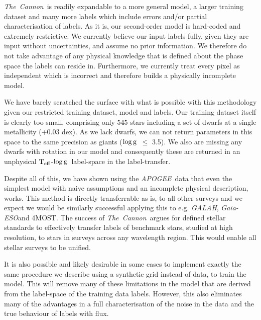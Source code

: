 \documentclass[12pt, preprint]{aastex}
\newcommand{\teff}{\mbox{$\rm T_{eff}$}}
\newcommand{\logg}{\mbox{$\rm \log g$}}
\newcommand{\tc}{\textsl{The~Cannon}}
\newcommand{\apogee}{\textsl{APOGEE}}
\newcommand{\gaiaeso}{\textsl{Gaia-ESO}}
\begin{document}
 \tc\ is readily expandable to a more general model, a larger training dataset and many more labels which include errors and/or partial characterisation of labels. As it is, our second-order model is hard-coded and extremely restrictive. We currently believe our input labels fully, given they are input without uncertainties, and assume no prior information. We therefore do not take advantage of any physical knowledge that is defined about the phase space the labels can reside in.  Furthermore, we currently treat every pixel as independent which is incorrect and therefore builds a physically incomplete model.

 We have barely scratched the surface with what is possible with this methodology given our restricted training dataset, model and labels. Our training dataset itself is clearly too small, comprising only 545 stars including a set of dwarfs at a single metallicity (+0.03 dex). As we lack dwarfs, we can not return parameters in this space to the same precision as giants (\logg\ $\le$ 3.5).  We also are missing any dwarfs with rotation in our model and consequently these are returned in an unphysical \teff-\logg\ label-space in the label-transfer. 
 
Despite all of this, we have shown using the \apogee\ data that even the simplest model with naive assumptions and an incomplete physical description, works. This method is directly transferrable as is, to all other surveys and we expect we would be similarly successful applying this to e.g. \textit{GALAH}, \gaiaeso and 4MOST. The success of \tc\ argues for defined stellar standards to effectively transfer labels of benchmark stars, studied at high resolution, to stars in surveys across any wavelength region. This would enable all stellar surveys to be unified. 
 
 It is also possible and likely desirable in some cases to implement exactly the same procedure we describe using a synthetic grid instead of data, to train the model. This will remove many of these limitations in the model that are derived from the label-space of the training data labels. However, this also eliminates many of the advantages in a full characterisation of the noise in the data and the true behaviour of labels with flux.%
 
\end{document}

